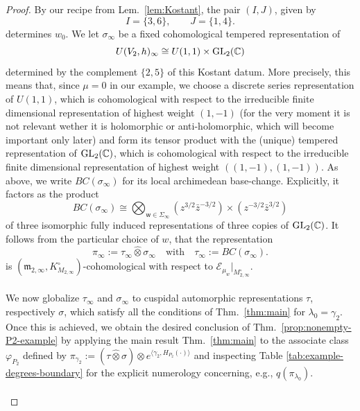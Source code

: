 \documentclass[a4paper,10pt]{amsart}
\theoremstyle{definition}
\numberwithin{equation}{section}
\def\C{\mathbb C}
\def\EE{\mathcal E}
\def\m{\mathfrak m}
\def\ww{\mathsf w}
\def\GL{{\rm GL}}
\begin{document}
\begin{proof}
By our recipe from Lem.\ \ref{lem:Kostant},  the pair $(I,J)$, given by
$$
        I=\{3,6\},
        \qquad
        J=\{1,4\}.
$$
determines $w_0$. We let $\sigma_\infty$ be a fixed cohomological tempered representation of
$$
        U(V_2,h)_\infty
        \cong
        U(1,1)\times \GL_2(\mathbb C)
$$
determined by the complement $\{2,5\}$ of this Kostant datum. More precisely, this means that, since $\mu=0$ in our example, we choose a discrete series representation of $U(1,1)$, which is cohomological with respect to the irreducible finite dimensional representation of highest weight $(1,-1)$ (for the very moment it is not relevant wether it is holomorphic or anti-holomorphic, which will become important only later) and form its tensor product with the (unique) tempered representation of $\GL_2(\C)$, which is cohomological with respect to the irreducible finite dimensional representation of highest weight $((1,-1),(1,-1))$. As above, we write $BC(\sigma_\infty)$ for its local archimedean base-change. Explicitly, it factors as the product 
\begin{equation}\label{BCok}
BC(\sigma_\infty)\cong \bigotimes_{\ww\in\Sigma_\infty}
        \left(z^{3/2}\bar z^{-3/2}\right)
        \times
        \left(z^{-3/2}\bar z^{3/2}\right)
\end{equation}
of three isomorphic fully induced representations of three copies of $\GL_2(\mathbb C)$. It follows from the particular choice of \(w\), that the representation 
$$
        \pi_\infty
        :=
        \tau_\infty\widehat\otimes\sigma_\infty
        \quad\text{with}\quad
        \tau_\infty:= BC(\sigma_\infty).
$$
is $(\m_{2,\infty}, K^\circ_{M_{2,\infty}})$-cohomological with respect to $\EE_{\mu_w}|_{M^\circ_{2,\infty}}$.\\\\ 
We now globalize $\tau_\infty$ and $\sigma_\infty$ to cuspidal automorphic representations $\tau$, respectively $\sigma$, which satisfy all the conditions of Thm.\ \ref{thm:main} for $\lambda_0=\gamma_2$. Once this is achieved, we obtain the desired conclusion of Thm.\ \ref{prop:nonempty-P2-example} by applying the main result Thm.\ \ref{thm:main} to the associate class $\varphi_{P_2}$ defined by $\pi_{\gamma_2}:=(\tau\hat\otimes\sigma)\otimes e^{\langle \gamma_2, H_{P_2}(\cdot)\rangle}$ and inspecting Table \ref{tab:example-degrees-boundary} for the explicit numerology concerning, e.g., $q(\pi_{\lambda_0})$.\\\\

\end{proof}
\end{document}
